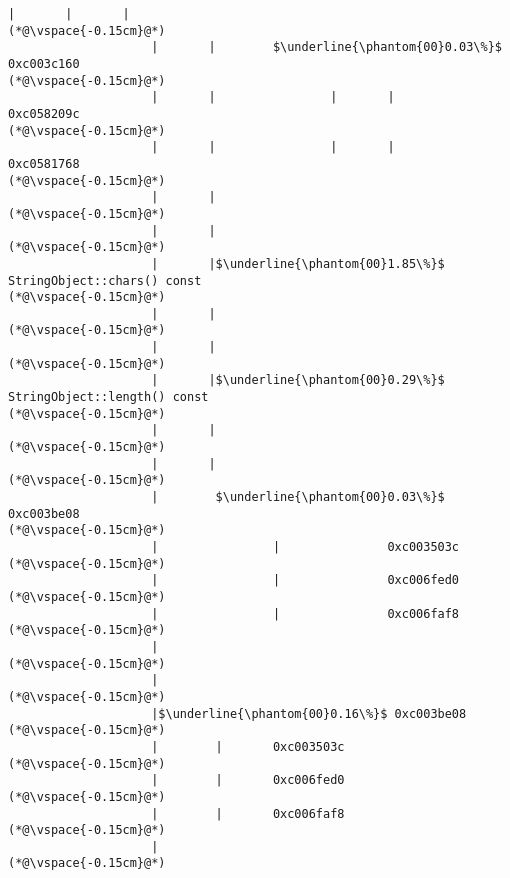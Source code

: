 \begin{lstlisting}[caption=Unicode-merkkijonon kopiointi C$\to$Java, label=profile:C2JCopyUnicode-512, numberbychapter=true, frame=lines, float, floatplacement=t]
                    |       |       |
(*@\vspace{-0.15cm}@*)
                    |       |        $\underline{\phantom{00}0.03\%}$ 0xc003c160
(*@\vspace{-0.15cm}@*)
                    |       |                |       |               0xc058209c
(*@\vspace{-0.15cm}@*)
                    |       |                |       |               0xc0581768
(*@\vspace{-0.15cm}@*)
                    |       |
(*@\vspace{-0.15cm}@*)
                    |       |
(*@\vspace{-0.15cm}@*)
                    |       |$\underline{\phantom{00}1.85\%}$ StringObject::chars() const
(*@\vspace{-0.15cm}@*)
                    |       |
(*@\vspace{-0.15cm}@*)
                    |       |
(*@\vspace{-0.15cm}@*)
                    |       |$\underline{\phantom{00}0.29\%}$ StringObject::length() const
(*@\vspace{-0.15cm}@*)
                    |       |
(*@\vspace{-0.15cm}@*)
                    |       |
(*@\vspace{-0.15cm}@*)
                    |        $\underline{\phantom{00}0.03\%}$ 0xc003be08
(*@\vspace{-0.15cm}@*)
                    |                |               0xc003503c
(*@\vspace{-0.15cm}@*)
                    |                |               0xc006fed0
(*@\vspace{-0.15cm}@*)
                    |                |               0xc006faf8
(*@\vspace{-0.15cm}@*)
                    |
(*@\vspace{-0.15cm}@*)
                    |
(*@\vspace{-0.15cm}@*)
                    |$\underline{\phantom{00}0.16\%}$ 0xc003be08
(*@\vspace{-0.15cm}@*)
                    |        |       0xc003503c
(*@\vspace{-0.15cm}@*)
                    |        |       0xc006fed0
(*@\vspace{-0.15cm}@*)
                    |        |       0xc006faf8
(*@\vspace{-0.15cm}@*)
                    |
(*@\vspace{-0.15cm}@*)

\end{lstlisting}
